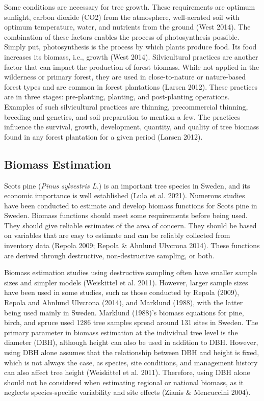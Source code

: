 \documentclass[11pt, a4paper]{report}
\begin{document}
Some conditions are necessary for tree growth. These requirements are optimum sunlight, carbon dioxide (CO2) from the atmosphere, well-aerated soil with optimum temperature, water, and nutrients from the ground (West 2014). The combination of these factors enables the process of photosynthesis possible. Simply put, photosynthesis is the process by which plants  produce food. Its food increases its biomass, i.e., growth (West 2014). Silvicultural practices are another factor that can impact the production of forest biomass. While not applied in the wilderness or primary forest, they are used in close-to-nature or nature-based forest types and are common in forest plantations (Larsen 2012). These practices are in three stages: pre-planting, planting, and post-planting operations. Examples of such silvicultural practices are thinning, precommercial thinning, breeding and genetics, and soil preparation to mention a few. The practices influence the survival, growth, development, quantity, and quality of tree biomass found in any forest plantation for a given period (Larsen 2012).

\subsection{Biomass Estimation}
Scots pine (\textit{Pinus sylvestris L.}) is an important tree species in Sweden, and its economic importance is well established (Lula et al. 2021). Numerous studies have been conducted to estimate and develop biomass functions for Scots pine in Sweden. Biomass functions should meet some requirements before being used. They should give reliable estimates of the area of concern. They should be based on variables that are easy to estimate and can be reliably collected from inventory data (Repola 2009; Repola \& Ahnlund Ulvcrona 2014). These functions are derived through destructive, non-destructive sampling, or both. 

Biomass estimation studies using destructive sampling often have smaller sample sizes and simpler models (Weiskittel et al. 2011). However, larger sample sizes have been used in some studies, such as those conducted by Repola (2009), Repola and Ahnlund Ulvcrona (2014), and Marklund (1988), with the latter being used mainly in Sweden. Marklund (1988)’s biomass  equations for pine, birch, and spruce used 1286 tree samples spread around 131 sites in Sweden. The primary parameter in biomass estimation at the individual tree level is the diameter (DBH), although height can also be used in addition to DBH. However, using DBH alone assumes that the relationship between DBH and height is fixed, which is not always the case, as species, site conditions, and management history can also affect tree height (Weiskittel et al. 2011). Therefore, using DBH alone should not be considered when estimating regional or national biomass, as it neglects species-specific variability and site effects (Zianis \& Mencuccini 2004).
\end{document}
